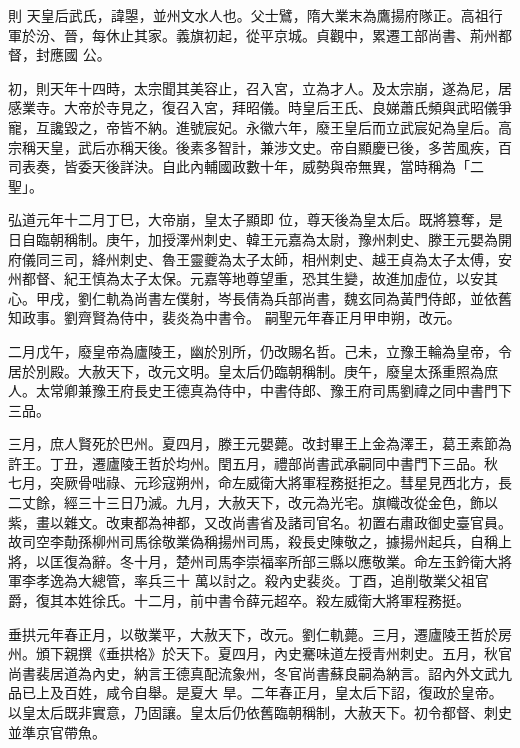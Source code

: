 
\begin{pinyinscope}

 則
 天皇后武氏，諱曌，並州文水人也。父士鷿，隋大業末為鷹揚府隊正。高祖行軍於汾、晉，每休止其家。義旗初起，從平京城。貞觀中，累遷工部尚書、荊州都督，封應國
 公。



 初，則天年十四時，太宗聞其美容止，召入宮，立為才人。及太宗崩，遂為尼，居感業寺。大帝於寺見之，復召入宮，拜昭儀。時皇后王氏、良娣蕭氏頻與武昭儀爭寵，互讒毀之，帝皆不納。進號宸妃。永徽六年，廢王皇后而立武宸妃為皇后。高宗稱天皇，武后亦稱天後。後素多智計，兼涉文史。帝自顯慶已後，多苦風疾，百司表奏，皆委天後詳決。自此內輔國政數十年，威勢與帝無異，當時稱為「二聖」。



 弘道元年十二月丁巳，大帝崩，皇太子顯即
 位，尊天後為皇太后。既將篡奪，是日自臨朝稱制。庚午，加授澤州刺史、韓王元嘉為太尉，豫州刺史、滕王元嬰為開府儀同三司，絳州刺史、魯王靈夔為太子太師，相州刺史、越王貞為太子太傅，安州都督、紀王慎為太子太保。元嘉等地尊望重，恐其生變，故進加虛位，以安其心。甲戌，劉仁軌為尚書左僕射，岑長倩為兵部尚書，魏玄同為黃門侍郎，並依舊知政事。劉齊賢為侍中，裴炎為中書令。
 嗣聖元年春正月甲申朔，改元。



 二月戊午，廢皇帝為廬陵王，幽於別所，仍改賜名哲。己未，立豫王輪為皇帝，令居於別殿。大赦天下，改元文明。皇太后仍臨朝稱制。庚午，廢皇太孫重照為庶人。太常卿兼豫王府長史王德真為侍中，中書侍郎、豫王府司馬劉禕之同中書門下三品。



 三月，庶人賢死於巴州。夏四月，滕王元嬰薨。改封畢王上金為澤王，葛王素節為許王。丁丑，遷廬陵王哲於均州。閏五月，禮部尚書武承嗣同中書門下三品。秋
 七月，突厥骨咄祿、元珍寇朔州，命左威衛大將軍程務挺拒之。彗星見西北方，長二丈餘，經三十三日乃滅。九月，大赦天下，改元為光宅。旗幟改從金色，飾以紫，畫以雜文。改東都為神都，又改尚書省及諸司官名。初置右肅政御史臺官員。故司空李勣孫柳州司馬徐敬業偽稱揚州司馬，殺長史陳敬之，據揚州起兵，自稱上將，以匡復為辭。冬十月，楚州司馬李崇福率所部三縣以應敬業。命左玉鈐衛大將軍李孝逸為大總管，率兵三十
 萬以討之。殺內史裴炎。丁酉，追削敬業父祖官爵，復其本姓徐氏。十二月，前中書令薛元超卒。殺左威衛大將軍程務挺。



 垂拱元年春正月，以敬業平，大赦天下，改元。劉仁軌薨。三月，遷廬陵王哲於房州。頒下親撰《垂拱格》於天下。夏四月，內史騫味道左授青州刺史。五月，秋官尚書裴居道為內史，納言王德真配流象州，冬官尚書蘇良嗣為納言。詔內外文武九品已上及百姓，咸令自舉。是夏大
 旱。二年春正月，皇太后下詔，復政於皇帝。以皇太后既非實意，乃固讓。皇太后仍依舊臨朝稱制，大赦天下。初令都督、刺史並準京官帶魚。




\end{pinyinscope}

